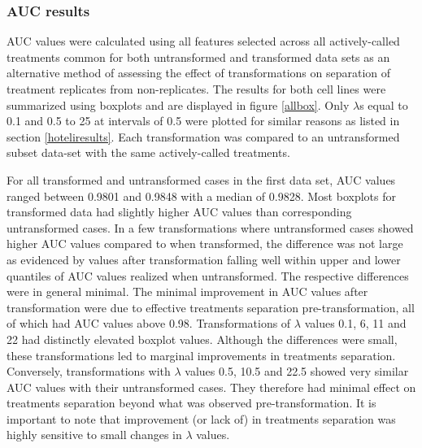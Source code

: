 \documentclass[11pt]{article}
\begin{document}
\clearpage
\subsubsection{AUC results}
\par{AUC values were calculated using all features selected across all actively-called treatments common for both untransformed and transformed data sets as an alternative method of assessing the effect of transformations on separation of treatment replicates from non-replicates. The results for both cell lines were summarized using boxplots and are displayed in figure \ref{allbox}. Only $\lambda$s equal to 0.1 and 0.5 to 25 at intervals of 0.5 were plotted for similar reasons as listed in section \ref{hoteliresults}. Each transformation was compared to an untransformed subset data-set with the same actively-called treatments.}

\par{For all transformed and untransformed cases in the first data set, AUC values ranged between 0.9801 and 0.9848 with a median of 0.9828. Most boxplots for transformed data had slightly higher AUC values than corresponding untransformed cases. In a few transformations where untransformed cases showed higher AUC values compared to when transformed, the difference was not large as evidenced by values after transformation falling well within upper and lower quantiles of AUC values realized when untransformed. The respective differences were in general minimal. The minimal improvement in AUC values after transformation were due to effective treatments separation pre-transformation, all of which had AUC values above 0.98. Transformations of $\lambda$ values 0.1, 6, 11 and 22 had distinctly elevated boxplot values. Although the differences were small, these transformations led to marginal improvements in treatments separation. Conversely, transformations with $\lambda$ values 0.5, 10.5 and 22.5 showed very similar AUC values with their untransformed cases. They therefore had minimal effect on treatments separation beyond what was observed pre-transformation. It is important to note that improvement (or lack of) in treatments separation was highly sensitive to small changes in $\lambda$ values. }
\end{document}

